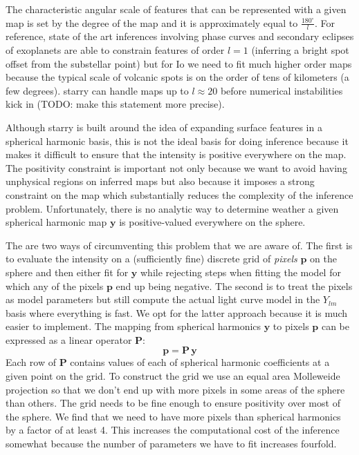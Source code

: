 \documentclass[modern]{aastex62}
\begin{document}
The characteristic angular scale of features that can be represented with a given map is set by the degree of the map and it is approximately equal to $\frac{180^\circ}{l}$.
For reference, state of the art inferences involving phase curves and secondary eclipses of exoplanets are able to constrain features of order $l=1$ (inferring a bright spot offset from the substellar point) but for Io we need to fit much higher order maps because the typical scale of volcanic spots is on the order of tens of kilometers (a few degrees).
\textsf{starry} can handle maps up to $l\approx 20$ before numerical instabilities kick in (TODO: make this statement more precise).

Although \textsf{starry} is built around the idea of expanding surface features in a spherical harmonic basis, this is not the ideal basis for doing inference because it makes it difficult to ensure that the intensity is positive everywhere on the map.
The positivity constraint is important not only because we want to avoid having unphysical regions on inferred maps but also because it imposes a strong constraint on the map which substantially reduces the complexity of the inference problem.
Unfortunately, there is no analytic way to determine weather a given spherical harmonic map $\mathbf{y}$ is positive-valued everywhere on the sphere. 

The are two ways of circumventing this problem that we are aware of.
The first is to evaluate the intensity on a (sufficiently fine) discrete grid of \emph{pixels} $\mathbf{p}$ on the sphere and then either fit for $\mathbf{y}$ while rejecting steps when fitting the model for which any of the pixels $\mathbf{p}$ end up being negative.
The second is to treat the pixels as model parameters but still compute the actual light curve model in the $Y_{lm}$ basis where everything is fast. 
We opt for the latter approach because it is much easier to implement.
The mapping from spherical harmonics $\mathbf{y}$ to pixels $\mathbf{p}$ can be expressed as a linear operator 
$\mathbf{P}$:
\begin{equation}
    \mathbf{p}=\mathbf{P}\,\mathbf{y}
\end{equation}
Each row of $\mathbf{P}$ contains values of each of spherical harmonic coefficients at a given point on the grid. 
To construct the grid we use an equal area Molleweide projection so that we don't end up with more pixels in some areas of the sphere than others.
The grid needs to be fine enough to ensure positivity over most of the sphere.
We find that we need to have more pixels than spherical harmonics by a factor of at least 4.
This increases the computational cost of the inference somewhat because the number of parameters we have to fit increases fourfold.
\end{document}
